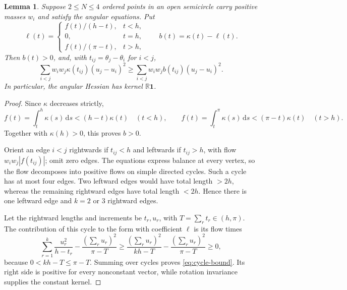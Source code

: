 \documentclass[11pt,a4paper]{article}
\numberwithin{equation}{section}
\newtheorem{lemma}[theorem]{Lemma}
\theoremstyle{remark}
\newcommand{\R}{\mathbb R}
\newcommand{\one}{\boldsymbol{1}}
\newcommand{\dd}{\,\mathrm d}
\begin{document}
\begin{lemma}\label{lem:cycle}
Suppose $2\le N\le4$ ordered points in an open semicircle carry positive masses $w_i$ and satisfy the angular equations. Put
\[
 \ell(t)=
 \begin{cases}
 f(t)/(h-t),&t<h,\\
 0,&t=h,\\
 f(t)/(\pi-t),&t>h,
 \end{cases}
 \qquad b(t)=\kappa(t)-\ell(t).
\]
Then $b(t)>0$, and, with $t_{ij}=\theta_j-\theta_i$ for $i<j$,
\begin{equation}\label{eq:cycle-bound}
 \sum_{i<j}w_iw_j\kappa(t_{ij})(u_j-u_i)^2
 \ge\sum_{i<j}w_iw_jb(t_{ij})(u_j-u_i)^2.
\end{equation}
In particular, the angular Hessian has kernel $\R\one$.
\end{lemma}
\begin{proof}
Since $\kappa$ decreases strictly,
\[
 f(t)=\int_t^h\kappa(s)\dd s<(h-t)\kappa(t)\quad(t<h),\qquad
 f(t)=\int_t^\pi\kappa(s)\dd s<(\pi-t)\kappa(t)\quad(t>h).
\]
Together with $\kappa(h)>0$, this proves $b>0$.

Orient an edge $i<j$ rightwards if $t_{ij}<h$ and leftwards if $t_{ij}>h$, with flow $w_iw_j|f(t_{ij})|$; omit zero edges. The equations express balance at every vertex, so the flow decomposes into positive flows on simple directed cycles. Such a cycle has at most four edges. Two leftward edges would have total length $>2h$, whereas the remaining rightward edges have total length $<2h$. Hence there is one leftward edge and $k=2$ or $3$ rightward edges.

Let the rightward lengths and increments be $t_r,u_r$, with
$T=\sum_rt_r\in(h,\pi)$. The contribution of this cycle to the form with coefficient $\ell$ is its flow times
\[
 \sum_{r=1}^k\frac{u_r^2}{h-t_r}
 -\frac{(\sum_ru_r)^2}{\pi-T}
 \ge\frac{(\sum_ru_r)^2}{kh-T}
 -\frac{(\sum_ru_r)^2}{\pi-T}\ge0,
\]
because $0<kh-T\le\pi-T$. Summing over cycles proves \eqref{eq:cycle-bound}. Its right side is positive for every nonconstant vector, while rotation invariance supplies the constant kernel.
\end{proof}
\end{document}
